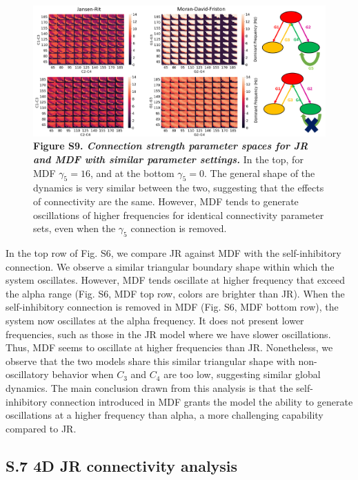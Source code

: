 \documentclass[12pt,twoside]{article}
\begin{document}
\begin{figure}[H]
    \centering
    \includegraphics[scale=0.5]{Images/MDF_Appendix.png}
    \caption*{\textbf{Figure S9.  \textit{Connection strength parameter spaces for JR and MDF with similar parameter settings.}} In the top, for MDF $\gamma_{5} = 16$, and at the bottom $\gamma_{5} = 0$. The general shape of the dynamics is very similar between the two, suggesting that the effects of connectivity are the same. However, MDF tends to generate oscillations of higher frequencies for identical connectivity parameter sets, even when the $\gamma_{5}$ connection is removed.}     
    \label{fig:LI_CS}
\end{figure}

In the top row of Fig. S6, we compare JR against MDF with the self-inhibitory connection. We observe a similar triangular boundary shape within which the system oscillates. However, MDF tends oscillate at higher frequency that exceed the alpha range (Fig. S6, MDF top row, colors are brighter than JR). When the self-inhibitory connection is removed in MDF (Fig. S6, MDF bottom row), the system now oscillates at the alpha frequency. It does not present lower frequencies, such as those in the JR model where we have slower oscillations. Thus, MDF seems to oscillate at higher frequencies than JR. Nonetheless, we observe that the two models share this similar triangular shape with non-oscillatory behavior when $C_3$ and $C_4$ are too low, suggesting similar global dynamics. The main conclusion drawn from this analysis is that the self-inhibitory connection introduced in MDF grants the model the ability to generate oscillations at a higher frequency than alpha, a more challenging capability compared to JR. 

\newpage
\subsection*{S.7 4D JR connectivity analysis}
\end{document}
